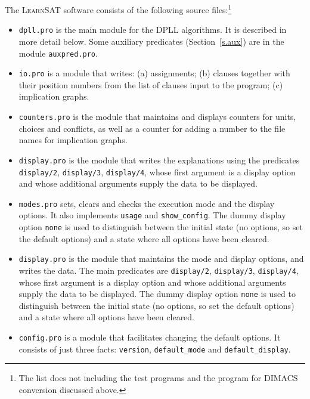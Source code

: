 \documentclass[11pt]{article}
\newcommand*{\p}[1]{\textup{\texttt{#1}}}
\newcommand*{\ls}{\textsc{LearnSAT}}
\begin{document}
The \ls{} software consists of the following source files:\footnote{The
list does not including the test programs and the program for DIMACS
conversion discussed above.}

\begin{itemize}
\item \p{dpll.pro} is the main module for the DPLL algorithms. It is
described in more detail below. Some auxiliary predicates
(Section~\ref{s.aux}) are in the module \p{auxpred.pro}.

\item \p{io.pro} is a module that writes: (a) assignments; (b) clauses
together with their position numbers from the list of clauses input to
the program; (c) implication graphs.

\item \p{counters.pro} is the module that maintains and displays counters
for units, choices and conflicts, as well as a counter for adding a
number to the file names for implication graphs.

\item \p{display.pro} is the module that writes the explanations using
the predicates \p{display/2},
\p{display/3}, \p{display/4}, whose first argument is a display option
and whose additional arguments supply the data to be displayed.

\item \p{modes.pro} sets, clears and checks the execution mode and the
display options. It also implements \p{usage} and \p{show\_config}. The
dummy display option \p{none} is used to distinguish between the initial
state (no options, so set the default options) and a state where all
options have been cleared.

\item \p{display.pro} is the module that maintains the mode and display
options, and writes the data. The main predicates are \p{display/2},
\p{display/3}, \p{display/4}, whose first argument is a display option
and whose additional arguments supply the data to be displayed. The
dummy display option \p{none} is used to distinguish between the initial
state (no options, so set the default options) and a state where all
options have been cleared.

\item \p{config.pro} is a module that facilitates changing the default
options. It consists of just three facts: \p{version}, \p{default\_mode}
and \p{default\_display}.

\end{itemize}
\end{document}
